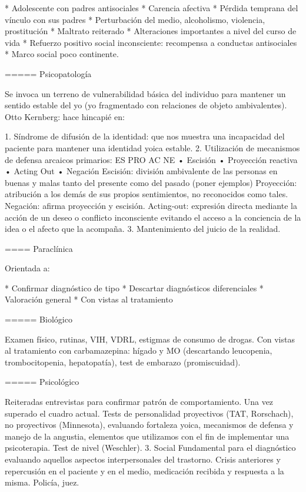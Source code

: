 * Adolescente con padres antisociales
* Carencia afectiva
* Pérdida temprana del vínculo con sus padres
* Perturbación del medio, alcoholismo, violencia, prostitución
* Maltrato reiterado
* Alteraciones importantes a nivel del curso de vida
* Refuerzo positivo social inconsciente: recompensa a conductas antisociales
* Marco social poco continente.

===== Psicopatología

Se invoca un terreno de vulnerabilidad básica del individuo para mantener un sentido estable del yo (yo fragmentado con relaciones de objeto ambivalentes). Otto Kernberg: hace hincapié en:

1. Síndrome de difusión de la identidad: que nos muestra una incapacidad del paciente para mantener una identidad yoica estable.
2. Utilización de mecanismos de defensa arcaicos primarios: ES PRO AC NE • Escisión • Proyección reactiva • Acting Out • Negación Escisión: división ambivalente de las personas en buenas y malas tanto del presente como del pasado (poner ejemplos) Proyección: atribución a los demás de sus propios sentimientos, no reconocidos como tales. Negación: afirma proyección y escisión. Acting-out: expresión directa mediante la acción de un deseo o conflicto inconsciente evitando el acceso a la conciencia de la idea o el afecto que la acompaña.
3. Mantenimiento del juicio de la realidad.

==== Paraclínica

Orientada a:

* Confirmar diagnóstico de tipo
* Descartar diagnósticos diferenciales
* Valoración general
* Con vistas al tratamiento

===== Biológico

Examen físico, rutinas, VIH, VDRL, estigmas de consumo de drogas. Con vistas al tratamiento con carbamazepina: hígado y MO (descartando leucopenia, trombocitopenia, hepatopatía), test de embarazo (promiscuidad).

===== Psicológico

Reiteradas entrevistas para confirmar patrón de comportamiento. Una vez superado el cuadro actual. Tests de personalidad proyectivos (TAT, Rorschach), no proyectivos (Minnesota), evaluando fortaleza yoica, mecanismos de defensa y manejo de la angustia, elementos que utilizamos con el fin de implementar una psicoterapia. Test de nivel (Weschler). 3. Social Fundamental para el diagnóstico evaluando aquellos aspectos interpersonales del trastorno. Crisis anteriores y repercusión en el paciente y en el medio, medicación recibida y respuesta a la misma. Policía, juez.

